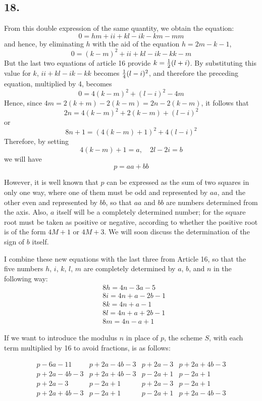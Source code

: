 \documentclass[twoside,12pt, showframe]{memoir}
\let\oldfrac\frac
\def\frac#1#2{\mathchoice{\tfrac{#1}{#2}}{\oldfrac{#1}{#2}}{\genfrac{}{}{}{2}{#1}{#2\mathstrut}}{\genfrac{}{}{}{3}{#1}{#2\mathstrut}}}
\begin{document}
\subsection*{18.}

From this double expression of the same quantity, we obtain the equation:
\[0=h m+i i+k l-i k-k m-m m\]
and hence, by eliminating \(h\) with the aid of the equation \(h=2 m-k-1\),
\[0=(k-m)^{2}+i i+k l-i k-k k-m\]
But the last two equations of article 16 provide \(k=\frac{1}{2}(l+i)\). By substituting this value for \(k\), \(i i+k l-i k-k k\) becomes \(\frac{1}{4}(l-i)^{2}\), and therefore the preceding equation, multiplied by 4, becomes
\[0=4(k-m)^{2}+(l-i)^{2}-4 m\]
Hence, since \(4 m=2(k+m)-2(k-m)=2 n-2(k-m)\), it follows that
\[2 n=4(k-m)^{2}+2(k-m)+(l-i)^{2}\]
or
\[8 n+1=(4(k-m)+1)^{2}+4(l-i)^{2}\]
Therefore, by setting
\[4(k-m)+1=a,\quad 2 l-2 i=b\]
we will have
\[p=a a+b b\]
%

However, it is well known that \(p\) can be expressed as the sum of two squares in only one way, where one of them must be odd and represented by \(a a\), and the other even and represented by \(b b\), so that \(a a\) and \(b b\) are numbers determined from the axis. Also, \(a\) itself will be a completely determined number; for the square root must be taken as positive or negative, according to whether the positive root is of the form \(4 M+1\) or \(4 M+3\). We will soon discuss the determination of the sign of \(b\) itself.
%

\clearpage\noindent%
I combine these new equations with the last three from Article 16, so that the five numbers \(h\), \(i\), \(k\), \(l\), \(m\) are completely determined by \(a\), \(b\), and \(n\) in the following way:
\[\begin{aligned}
& 8 h=4 n-3 a-5 \\
& 8 i=4 n+a-2 b-1 \\
& 8 k=4 n+a-1 \\
& 8 l=4 n+a+2 b-1 \\
& 8 m=4 n-a+1
\end{aligned}\]
%

If we want to introduce the modulus \(n\) in place of \(p\), the scheme \({S}\), with each term multiplied by 16 to avoid fractions, is as follows:

\[
\begin{array}{l|l|l|l}
p-6 a-11 & p+2 a-4 b-3 & p+2 a-3 & p+2 a+4 b-3 \\
p+2 a-4 b-3 & p+2 a+4 b-3 & p-2 a+1 & p-2 a+1 \\
p+2 a-3 & p-2 a+1 & p+2 a-3 & p-2 a+1 \\
p+2 a+4 b-3 & p-2 a+1 & p-2 a+1 & p+2 a-4 b-3
\end{array}
\]
%
\end{document}
